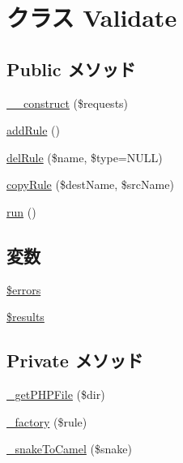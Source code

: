 \hypertarget{class_validate}{
\section{クラス \-Validate}
\label{class_validate}
}
\subsection*{\-Public メソッド}
\begin{DoxyCompactItemize}
\item 
\hyperlink{class_validate_affd2166b9ae24d7f6d972b6e8e27ab64}{\-\_\-\-\_\-construct} (\$requests)
\item 
\hyperlink{class_validate_a0f28658da9689c7abbfeef6620621b11}{add\-Rule} ()
\item 
\hyperlink{class_validate_a3784964295510f2bf9e3c08945073a6e}{del\-Rule} (\$name, \$type=\-N\-U\-L\-L)
\item 
\hyperlink{class_validate_afc81a53f0add88b49c6f84068d47987b}{copy\-Rule} (\$dest\-Name, \$src\-Name)
\item 
\hyperlink{class_validate_afb0fafe7e02a3ae1993c01c19fad2bae}{run} ()
\end{DoxyCompactItemize}
\subsection*{変数}
\begin{DoxyCompactItemize}
\item 
\hyperlink{class_validate_ab24faf4aa647cdcee494fc48524ad4ff}{\$errors}
\item 
\hyperlink{class_validate_a233d12bd8b6d3453e9a7a3f0b8c31db2}{\$results}
\end{DoxyCompactItemize}
\subsection*{\-Private メソッド}
\begin{DoxyCompactItemize}
\item 
\hyperlink{class_validate_a07744bc1e35651a75c8381412892098b}{\-\_\-get\-P\-H\-P\-File} (\$dir)
\item 
\hyperlink{class_validate_a21a27df268c633979bf9540d832e89a2}{\-\_\-factory} (\$rule)
\item 
\hyperlink{class_validate_aaf3f392101e52d137e821b081e57304d}{\-\_\-snake\-To\-Camel} (\$snake)
\end{DoxyCompactItemize}
